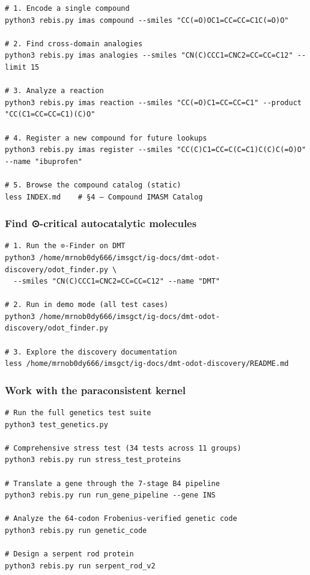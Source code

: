 \begin{verbatim}
# 1. Encode a single compound
python3 rebis.py imas compound --smiles "CC(=O)OC1=CC=CC=C1C(=O)O"

# 2. Find cross-domain analogies
python3 rebis.py imas analogies --smiles "CN(C)CCC1=CNC2=CC=CC=C12" --limit 15

# 3. Analyze a reaction
python3 rebis.py imas reaction --smiles "CC(=O)C1=CC=CC=C1" --product "CC(C1=CC=CC=C1)(C)O"

# 4. Register a new compound for future lookups
python3 rebis.py imas register --smiles "CC(C)C1=CC=C(C=C1)C(C)C(=O)O" --name "ibuprofen"

# 5. Browse the compound catalog (static)
less INDEX.md    # §4 — Compound IMASM Catalog
\end{verbatim}

\hypertarget{find--critical-autocatalytic-molecules}{%
\subsubsection{Find ⊙-critical autocatalytic
molecules}\label{find--critical-autocatalytic-molecules}}

\begin{verbatim}
# 1. Run the ⊙-Finder on DMT
python3 /home/mrnob0dy666/imsgct/ig-docs/dmt-odot-discovery/odot_finder.py \
  --smiles "CN(C)CCC1=CNC2=CC=CC=C12" --name "DMT"

# 2. Run in demo mode (all test cases)
python3 /home/mrnob0dy666/imsgct/ig-docs/dmt-odot-discovery/odot_finder.py

# 3. Explore the discovery documentation
less /home/mrnob0dy666/imsgct/ig-docs/dmt-odot-discovery/README.md
\end{verbatim}

\hypertarget{work-with-the-paraconsistent-kernel}{%
\subsubsection{Work with the paraconsistent
kernel}\label{work-with-the-paraconsistent-kernel}}

\begin{verbatim}
# Run the full genetics test suite
python3 test_genetics.py

# Comprehensive stress test (34 tests across 11 groups)
python3 rebis.py run stress_test_proteins

# Translate a gene through the 7-stage B4 pipeline
python3 rebis.py run run_gene_pipeline --gene INS

# Analyze the 64-codon Frobenius-verified genetic code
python3 rebis.py run genetic_code

# Design a serpent rod protein
python3 rebis.py run serpent_rod_v2
\end{verbatim}

